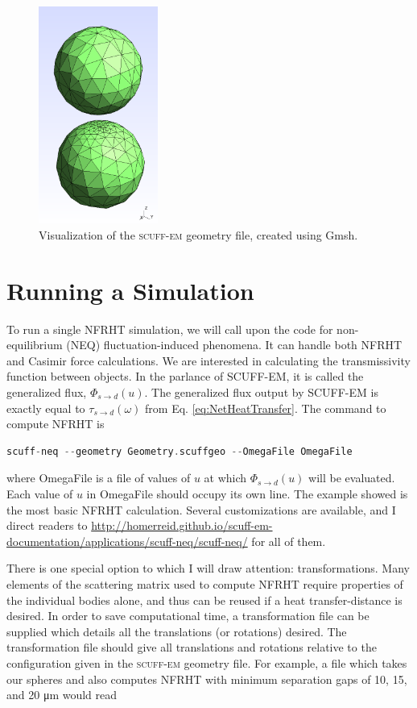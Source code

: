 \begin{figure}
\centering
\includegraphics[width=0.35\textwidth]{./Figures/SCUFF_Visualization.png}
\caption{\label{fig:SCUFF_Visualization}Visualization of the \textsc{scuff-em} geometry file, created using Gmsh.}
\end{figure}


\section{Running a Simulation}
%
To run a single NFRHT simulation, we will call upon the code for non-equilibrium (NEQ) fluctuation-induced phenomena. It can handle both NFRHT and Casimir force calculations. We are interested in calculating the transmissivity function between objects. In the parlance of SCUFF-EM, it is called the generalized flux, $\Phi_{s \rightarrow d}(u)$. The generalized flux output by SCUFF-EM is exactly equal to $\tau_{s \rightarrow d}(\omega)$ from Eq. \ref{eq:NetHeatTransfer}. The command to compute NFRHT is
%
\begin{lstlisting}[language=C++]
scuff-neq --geometry Geometry.scuffgeo --OmegaFile OmegaFile
\end{lstlisting}
%
where OmegaFile is a file of values of $u$ at which $\Phi_{s \rightarrow d}(u)$ will be evaluated. Each value of $u$ in OmegaFile should occupy its own line. The example showed is the most basic NFRHT calculation. Several customizations are available, and I direct readers to \url{http://homerreid.github.io/scuff-em-documentation/applications/scuff-neq/scuff-neq/} for all of them.

There is one special option to which I will draw attention: transformations. Many elements of the scattering matrix used to compute NFRHT require properties of the individual bodies alone, and thus can be reused if a heat transfer-distance is desired. In order to save computational time, a transformation file can be supplied which details all the translations (or rotations) desired. The transformation file should give all translations and rotations relative to the configuration given in the \textsc{scuff-em} geometry file. For example, a file which takes our spheres and also computes NFRHT with minimum separation gaps of 10, 15, and 20 \si{\micro\meter} would read

